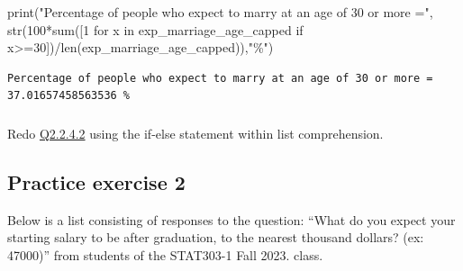 \documentclass[
  letterpaper,
  DIV=11,
  numbers=noendperiod]{scrreprt}
\newenvironment{Shaded}{\begin{snugshade}}{\end{snugshade}}
\newcommand{\BuiltInTok}[1]{\textcolor[rgb]{0.00,0.23,0.31}{#1}}
\newcommand{\ControlFlowTok}[1]{\textcolor[rgb]{0.00,0.23,0.31}{#1}}
\newcommand{\DecValTok}[1]{\textcolor[rgb]{0.68,0.00,0.00}{#1}}
\newcommand{\KeywordTok}[1]{\textcolor[rgb]{0.00,0.23,0.31}{#1}}
\newcommand{\NormalTok}[1]{\textcolor[rgb]{0.00,0.23,0.31}{#1}}
\newcommand{\OperatorTok}[1]{\textcolor[rgb]{0.37,0.37,0.37}{#1}}
\newcommand{\StringTok}[1]{\textcolor[rgb]{0.13,0.47,0.30}{#1}}
\begin{document}
\begin{Shaded}
\begin{Highlighting}[]
\BuiltInTok{print}\NormalTok{(}\StringTok{"Percentage of people who expect to marry at an age of 30 or more ="}\NormalTok{, }\BuiltInTok{str}\NormalTok{(}\DecValTok{100}\OperatorTok{*}\BuiltInTok{sum}\NormalTok{([}\DecValTok{1} \ControlFlowTok{for}\NormalTok{ x }\KeywordTok{in}\NormalTok{ exp\_marriage\_age\_capped }\ControlFlowTok{if}\NormalTok{ x}\OperatorTok{\textgreater{}=}\DecValTok{30}\NormalTok{])}\OperatorTok{/}\BuiltInTok{len}\NormalTok{(exp\_marriage\_age\_capped)),}\StringTok{"\%"}\NormalTok{)}
\end{Highlighting}
\end{Shaded}

\begin{verbatim}
Percentage of people who expect to marry at an age of 30 or more = 37.01657458563536 %
\end{verbatim}

\hypertarget{section-3}{%
\subsubsection{}\label{section-3}}

Redo
\href{https://nustat.github.io/DataScience_Intro_python/data_structures.html\#section-1}{Q2.2.4.2}
using the if-else statement within list comprehension.

\hypertarget{practice-exercise-2}{%
\subsection{Practice exercise 2}\label{practice-exercise-2}}

Below is a list consisting of responses to the question: ``What do you
expect your starting salary to be after graduation, to the nearest
thousand dollars? (ex: 47000)'' from students of the STAT303-1 Fall
2023. class.
\end{document}
